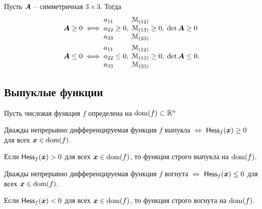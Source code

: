 \begin{propuesta}\label{3times3definitness}
Пусть ${\bm A}$ -- симметричная $3\times 3$. Тогда
\begin{align*}
	{\bm A}\geq 0 &\iff \begin{matrix} a_{11} \\ a_{22} \\ a_{33} \end{matrix}\geq0,\;
	\begin{matrix} {\mathcal M}_{(12)} \\ {\mathcal M}_{(13)} \\ {\mathcal M}_{(23)} \end{matrix}\geq0,\;
	\det{\bm A}\geq0\\
	{\bm A}\leq 0 &\iff \begin{matrix} a_{11} \\ a_{22} \\ a_{33} \end{matrix}\leq0,\;
	\begin{matrix} {\mathcal M}_{(12)} \\ {\mathcal M}_{(13)} \\ {\mathcal M}_{(23)} \end{matrix}\geq0,\;
	\det{\bm A}\leq0.
\end{align*}
\end{propuesta}

\subsection{Выпуклые функции}

Пусть числовая функция \(f\) определена на %
\(\operatorname{dom}(f)\subset {\mathbb R}^n\)

\begin{teorema}
Дважды непрерывно дифференцируемая функция $f$ выпукла $\iff$ 
${\mathsf {Hess}}_f({\bm x})\geq0$ %
для всех ${\bm x}\in\operatorname{dom}(f)$.

Если ${\mathsf {Hess}}_f({\bm x})>0$ для всех ${\bm x}\in\operatorname{dom}(f)$, 
то функция строго выпукла на $\operatorname{dom}(f)$.
\end{teorema}

\begin{col}
Дважды непрерывно дифференцируемая функция $f$ вогнута $\iff$ 
${\mathsf {Hess}}_f({\bm x})\leq0$ %
для всех ${\bm x}\in\operatorname{dom}(f)$.

Если ${\mathsf {Hess}}_f({\bm x})<0$ для всех ${\bm x}\in\operatorname{dom}(f)$, 
то функция строго вогнута
на $\operatorname{dom}(f)$.
\end{col}

